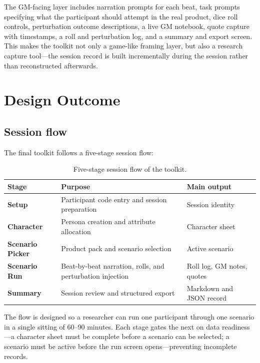 \documentclass[12pt,a4paper]{report}
\begin{document}
The GM-facing layer includes narration prompts for each beat, task prompts specifying
what the participant should attempt in the real product, dice roll controls, perturbation
outcome descriptions, a live GM notebook, quote capture with timestamps, a roll and
perturbation log, and a summary and export screen.
This makes the toolkit not only a game-like framing layer, but also a research capture
tool---the session record is built incrementally during the session rather than
reconstructed afterwards.

\chapter{Design Outcome}

\section{Session flow}

The final toolkit follows a five-stage session flow:

\begin{table}[h]
\centering
\small
\begin{tabularx}{\textwidth}{>{\bfseries}p{}Y Y}
\toprule
Stage & Purpose & Main output \\
\midrule
Setup           & Participant code entry and session preparation & Session identity \\
Character       & Persona creation and attribute allocation & Character sheet \\
Scenario Picker & Product pack and scenario selection & Active scenario \\
Scenario Run    & Beat-by-beat narration, rolls, and perturbation injection & Roll log, GM notes, quotes \\
Summary         & Session review and structured export & Markdown and JSON record \\
\bottomrule
\end{tabularx}
\caption{Five-stage session flow of the toolkit.}
\end{table}

The flow is designed so a researcher can run one participant through one scenario in a
single sitting of 60--90 minutes.
Each stage gates the next on data readiness---a character sheet must be complete before
a scenario can be selected; a scenario must be active before the run screen
opens---preventing incomplete records.
\end{document}
